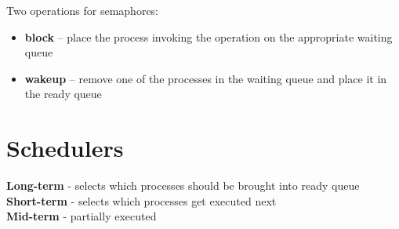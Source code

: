 \documentclass{article}
\begin{document}
    Two operations for semaphores:

    \begin{itemize}
      \item {\color{blue} \textbf{block}} -- place the process invoking the operation on the appropriate waiting queue
      \item {\color{blue} \textbf{wakeup}} -- remove one of the processes in the waiting queue and place it in the ready queue
    \end{itemize}

    \section*{Schedulers}

    \textbf{Long-term} - selects which processes should be brought into ready queue \\
    \textbf{Short-term} - selects which processes get executed next \\
    \textbf{Mid-term} - partially executed \\
\end{document}
